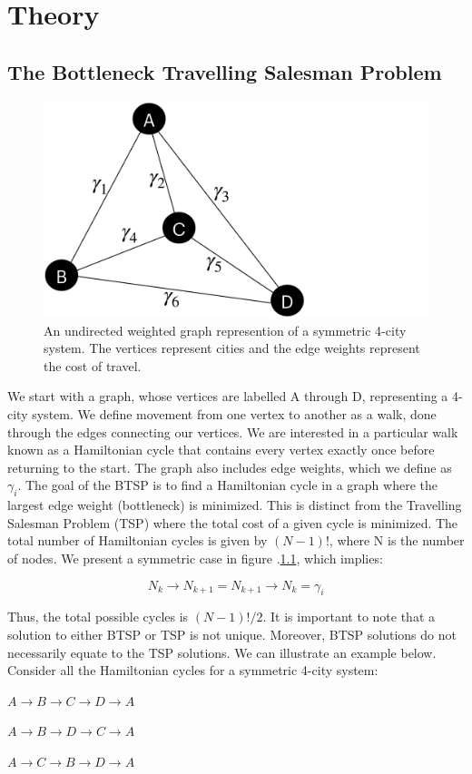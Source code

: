 \documentclass[msc,oneside]{ubcthesis}
\begin{document}
	\chapter{Theory}
	\section{The Bottleneck Travelling Salesman Problem}


\begin{figure}[!h]
	\centering
	\includegraphics[trim={0 0 21.9cm 0},clip, width=0.4 \linewidth]{"graphics/4-city"}
	\caption{An undirected weighted graph represention of a  symmetric 4-city system.  The vertices represent cities and the edge weights represent the cost of travel. }
	\label{fig:4-city-graphic}
\end{figure}		

We start with a graph, whose vertices are labelled A through D, representing a 4-city system. We define movement from one vertex to another as a walk, done through the edges connecting our vertices. We are interested in a particular walk known as a Hamiltonian cycle that contains every vertex exactly once before returning to the start. The graph also includes edge weights, which we define as $ \gamma_i $.
The goal of the BTSP is to find a Hamiltonian cycle in a graph where the largest edge weight (bottleneck) is minimized. This is distinct from the Travelling Salesman Problem (TSP) where the total cost of a given cycle is minimized. The total number of Hamiltonian cycles is given by $(N-1)!$, where N is the number of nodes. We present a symmetric case in figure .\ref{fig:4-city-graphic}, which implies:

 $$N_k \rightarrow N_{k+1} = N_{k+1} \rightarrow N_{k} = \gamma_i$$
 
 Thus, the total possible cycles is  $(N-1)!/2$.  It is important to note that a solution to either BTSP or TSP is not unique. Moreover, BTSP solutions do not necessarily equate to the TSP solutions. We can illustrate an example below. Consider all the Hamiltonian cycles for a symmetric 4-city system:

\begin{center}
	$ A \rightarrow B \rightarrow C \rightarrow D \rightarrow A $
	
	$ A \rightarrow B \rightarrow D \rightarrow C \rightarrow A $ 
	
	$ A \rightarrow C \rightarrow B \rightarrow D \rightarrow A $
\end{center}
\end{document}
